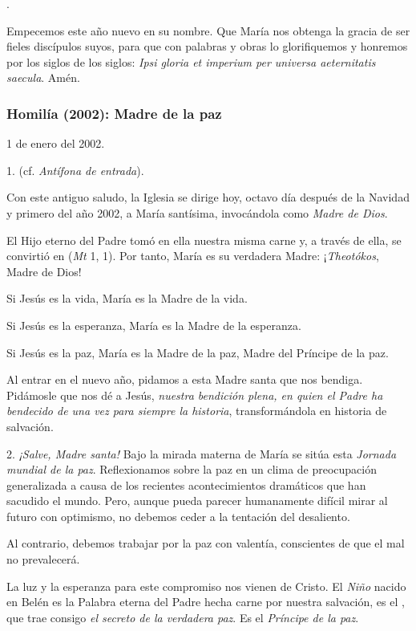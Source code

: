 .

Empecemos este año nuevo en su nombre. Que María nos obtenga la gracia de ser fieles discípulos suyos, para que con palabras y obras lo glorifiquemos y honremos por los siglos de los siglos: \emph{Ipsi gloria et imperium per universa aeternitatis saecula}. Amén.

\subsubsection{Homilía (2002): Madre de la paz}

1 de enero del 2002.

1.  (cf. \emph{Antífona de entrada}).

Con este antiguo saludo, la Iglesia se dirige hoy, octavo día después de la Navidad y primero del año 2002, a María santísima, invocándola como \emph{Madre de Dios}.

El Hijo eterno del Padre tomó en ella nuestra misma carne y, a través de ella, se convirtió en  (\emph{Mt} 1, 1). Por tanto, María es su verdadera Madre: ¡\emph{Theotókos}, Madre de Dios!

Si Jesús es la vida, María es la Madre de la vida.

Si Jesús es la esperanza, María es la Madre de la esperanza.

Si Jesús es la paz, María es la Madre de la paz, Madre del Príncipe de la paz.

Al entrar en el nuevo año, pidamos a esta Madre santa que nos bendiga. Pidámosle que nos dé a Jesús, \emph{nuestra bendición plena, en quien el Padre ha bendecido de una vez para siempre la historia}, transformándola en historia de salvación.

2. \emph{¡Salve, Madre santa!} Bajo la mirada materna de María se sitúa esta \emph{Jornada mundial de la paz}. Reflexionamos sobre la paz en un clima de preocupación generalizada a causa de los recientes acontecimientos dramáticos que han sacudido el mundo. Pero, aunque pueda parecer humanamente difícil mirar al futuro con optimismo, no debemos ceder a la tentación del desaliento.

Al contrario, debemos trabajar por la paz con valentía, conscientes de que el mal no prevalecerá.

La luz y la esperanza para este compromiso nos vienen de Cristo. El \emph{Niño} nacido en Belén es la Palabra eterna del Padre hecha carne por nuestra salvación, es el , que trae consigo \emph{el secreto de la verdadera paz}. Es el \emph{Príncipe de la paz}.

